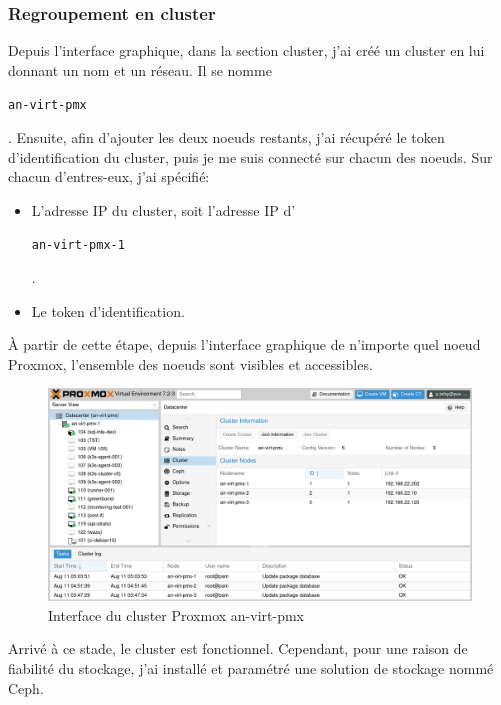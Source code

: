 \documentclass[12pt]{article}
\begin{document}
\subsubsection{Regroupement en cluster}
Depuis l'interface graphique, dans la section \gls{cluster}, j'ai créé un \gls{cluster} en lui donnant un nom et un réseau. 
Il se nomme \begin{code}\texttt{an-virt-pmx}\end{code}.
Ensuite, afin d'ajouter les deux noeuds restants, j'ai récupéré le token d'identification du \gls{cluster}, puis je me suis connecté sur chacun des noeuds. 
Sur chacun d'entres-eux, j'ai spécifié:
\begin{itemize}
    \item L'adresse \gls{IP} du \gls{cluster}, soit l'adresse \gls{IP} d'\begin{code}\texttt{an-virt-pmx-1}\end{code}.
    \item Le token d'identification.
\end{itemize}

À partir de cette étape, depuis l'interface graphique de n'importe quel noeud \gls{Proxmox}, l'ensemble des noeuds sont visibles et accessibles.

\begin{figure}[ht!]
    \centering
        \includegraphics[width=\textwidth]{src/interface_proxmox_main.png}
    \caption{Interface du \gls{cluster} \gls{Proxmox} an-virt-pmx}
    \label{fig:proxmox_virt1}
\end{figure}

Arrivé à ce stade, le \gls{cluster} est fonctionnel. 
Cependant, pour une raison de fiabilité du stockage, j'ai installé et paramétré une solution de stockage nommé \gls{Ceph}.

\newpage
\end{document}
